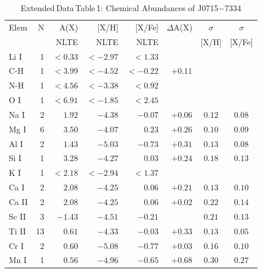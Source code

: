 \documentclass{natureprintstyle}
\newcommand{\umpstar}{J0715$-$7334\xspace}
\begin{document}
\captionsetup[figure]{labelformat=empty}
\captionsetup[table]{labelformat=empty}
\renewcommand{\thefigure}{Extended Data Figure \arabic{figure}}
\renewcommand{\thetable}{Extended Data Table \arabic{table}}

\begin{table}
\setlength{\tabcolsep}{2.5pt}
\caption{Extended\,Data\,Table\,1: Chemical Abundances of \umpstar\label{tab:abunds}}
\begin{tabular}{lrrrrrcc}
\hline
Elem & N & A(X)   & [X/H] & [X/Fe] & $\Delta$A(X) & $\sigma$ & $\sigma$ \\
     &   & NLTE   & NLTE  & NLTE   &              & [X/H]    & [X/Fe]   \\
\hline
Li I  &  1 &${<}{ 0.33}$&${<}{-2.97}$&${<}{ 1.33}$&       &$    $&$    $\\ %
C-H   &  1 &${<}{ 3.99}$&${<}{-4.52}$&${<}{-0.22}$&$+0.11$&$    $&$    $\\ %
N-H   &  1 &${<}{ 4.56}$&${<}{-3.38}$&${<}{ 0.92}$&       &$    $&$    $\\ %
O I   &  1 &${<}{ 6.91}$&${<}{-1.85}$&${<}{ 2.45}$&       &$    $&$    $\\ %
Na I  &  2 &$   { 1.92}$&$   {-4.38}$&$   {-0.07}$&$+0.06$&$0.12$&$0.08$\\ %
Mg I  &  6 &$   { 3.50}$&$   {-4.07}$&$   { 0.23}$&$+0.26$&$0.10$&$0.09$\\ %
Al I  &  2 &$   { 1.43}$&$   {-5.03}$&$   {-0.73}$&$+0.31$&$0.13$&$0.08$\\ %
Si I  &  1 &$   { 3.28}$&$   {-4.27}$&$   { 0.03}$&$+0.24$&$0.18$&$0.13$\\ %
K I   &  1 &${<}{ 2.18}$&${<}{-2.94}$&${<}{ 1.37}$&       &$    $&$    $\\ %
Ca I  &  2 &$   { 2.08}$&$   {-4.25}$&$   { 0.06}$&$+0.21$&$0.13$&$0.10$\\ %
Ca II &  2 &$   { 2.08}$&$   {-4.25}$&$   { 0.06}$&$+0.02$&$0.22$&$0.14$\\ %
Sc II &  3 &$   {-1.43}$&$   {-4.51}$&$   {-0.21}$&       &$0.21$&$0.13$\\ %
Ti II & 13 &$   { 0.61}$&$   {-4.33}$&$   {-0.03}$&$+0.33$&$0.13$&$0.05$\\ %
Cr I  &  2 &$   { 0.60}$&$   {-5.08}$&$   {-0.77}$&$+0.03$&$0.16$&$0.10$\\ %
Mn I  &  1 &$   { 0.56}$&$   {-4.96}$&$   {-0.65}$&$+0.68$&$0.30$&$0.27$\\ %

\end{tabular}
\end{table}
\end{document}
